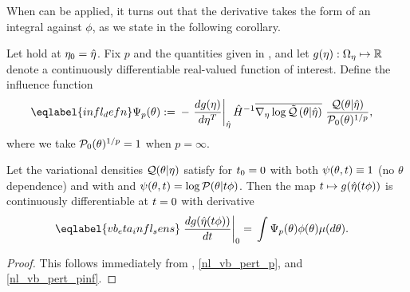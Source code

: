When  can be applied,  it turns out that the derivative takes
the form of an integral against $\phi$, as we state in the following corollary.


\begin{cor}
%
Let  hold at $\eta_0 = \hat\eta$.
%
Fix $p$ and the quantities given in , and let $g(\eta):
\Omega_{\eta} \mapsto \mathbb{R}$ denote a continuously differentiable real-valued
function of interest.  Define the influence function
%
\begin{align}\eqlabel{infl_defn}
%
\infl_p(\theta) :={}&
    - \fracat{d g(\eta)}{ d \eta^T}{\etaopt} \hessopt^{-1}
        \lqgradbar{\theta \vert \etaopt}
        \frac{\q(\theta \vert \etaopt)}{\pbase(\theta)^{1/p}},
%
%
%
\end{align}
%
where we take $\mathcal{P}_{0}(\theta)^{1/p}=1$ when $p = \infty$.

Let the variational densities $\mathcal{Q}(\theta \vert \eta)$ satisfy
 for $t_0 = 0$ with both $\psi(\theta, t) \equiv 1$ (no
$\theta$ dependence) and with and $\psi(\theta, t) = \log \mathcal{P}(\theta \vert t
\phi)$. Then the map $t \mapsto g(\hat\eta(t \phi))$ is continuously
differentiable at $t=0$ with derivative
%
\begin{align}\eqlabel{vb_eta_infl_sens}
%
\fracat{d g(\etaopt(\t \phi))}{d \t}{0} ={}&
    \int \infl_p(\theta) \phi(\theta) \mu(d\theta).
%
\end{align}
%
\begin{proof}
%
This follows immediately from , \eqref{nl_vb_pert_p}, and
\eqref{nl_vb_pert_pinf}.
%
\end{proof}
%
\end{cor}





